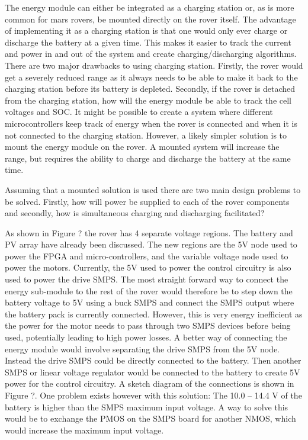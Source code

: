 \documentclass[a4paper]{article}
\begin{document}
The energy module can either be integrated as a charging station or, as is more 
common for mars rovers, be mounted directly on the rover itself. The advantage of 
implementing it as a charging station is that one would only ever charge or discharge 
the battery at a given time. This makes it easier to track the current and power 
in and out of the system and create charging/discharging algorithms. There are 
two major drawbacks to using charging station. Firstly, the rover would get a 
severely reduced range as it always needs to be able to make it back to the 
charging station before its battery is depleted. Secondly, if the rover is detached 
from the charging station, how will the energy module be able to track the cell 
voltages and SOC. It might be possible to create a system where different 
microcontrollers keep track of energy when the rover is connected and when it 
is not connected to the charging station. However, a likely simpler solution 
is to mount the energy module on the rover. A mounted system will increase 
the range, but requires the ability to charge and discharge the battery at the same time.

Assuming that a mounted solution is used there are two main design problems 
to be solved. Firstly, how will power be supplied to each of the rover components 
and secondly, how is simultaneous charging and discharging facilitated?

As shown in Figure ? the rover has 4 separate voltage regions. The battery and 
PV array have already been discussed. The new regions are the 5V node used to power 
the FPGA and micro-controllers, and the variable voltage node used to power the 
motors. Currently, the 5V used to power the control circuitry is also used to power 
the drive SMPS. The most straight forward way to connect the energy sub-module to 
the rest of the rover would therefore be to step down the battery voltage to 5V 
using a buck SMPS and connect the SMPS output where the battery pack is currently 
connected. However, this is very energy inefficient as the power for the motor needs 
to pass through two SMPS devices before being used, potentially leading to high power 
losses. A better way of connecting the energy module would involve separating the 
drive SMPS from the 5V node. Instead the drive SMPS could be directly connected to 
the battery. Then another SMPS or linear voltage regulator would be connected to the 
battery to create 5V power for the control circuitry. A sketch diagram of the 
connections is shown in Figure ?. One problem exists however with this solution: 
The 10.0 – 14.4 V of the battery is higher than the SMPS maximum input voltage. 
A way to solve this would be to exchange the PMOS on the SMPS board for another NMOS, 
which would increase the maximum input voltage.
\end{document}
